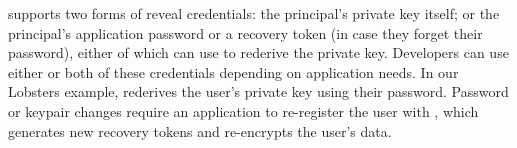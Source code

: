 %
\sys supports two forms of reveal credentials: \one{} the principal's private key
itself; or \two{} the principal's application password or a recovery
token (in case they forget their password), either of which \sys can use to rederive
the private key.
%
Developers can use either or both of these credentials depending on application needs.
%
In our Lobsters example, \sys rederives the user's private key using their password.
%
%
%
Password or keypair changes require an application to re-register the user with
\sys, which generates new recovery tokens and re-encrypts the user's \xxed data.
%
%
%
%

%
%



